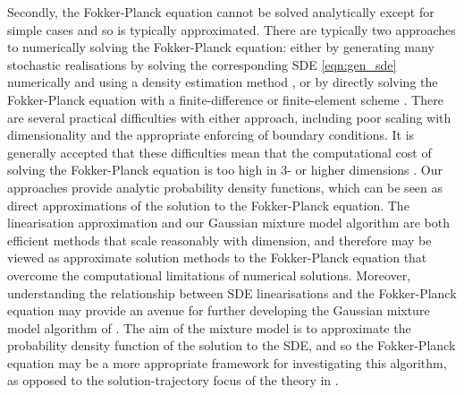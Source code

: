 Secondly, the Fokker-Planck equation cannot be solved analytically except for simple cases and so is typically approximated.
There are typically two approaches to numerically solving the Fokker-Planck equation: either by generating many stochastic realisations by solving the corresponding SDE \cref{eqn:gen_sde} numerically and using a density estimation method \citep{Silverman_2017_DensityEstimationStatistics}, or by directly solving the Fokker-Planck equation with a finite-difference or finite-element scheme \citep{PichlerEtAl_2013_NumericalSolutionFokker}.
There are several practical difficulties with either approach, including poor scaling with dimensionality and the appropriate enforcing of boundary conditions.
It is generally accepted that these difficulties mean that the computational cost of solving the Fokker-Planck equation is too high in \(3\)- or higher dimensions \citep{ZhaiEtAl_2022_DeepLearningMethod,Li_2019_DatadrivenMethodSteady,AllawalaMarston_2016_StatisticsStochasticallyForced,AndersonFarazmand_2024_FisherInformationShapemorphing}.
Our approaches provide analytic probability density functions, which can be seen as direct approximations of the solution to the Fokker-Planck equation.
The linearisation approximation and our Gaussian mixture model algorithm are both efficient methods that scale reasonably with dimension, and therefore may be viewed as approximate solution methods to the Fokker-Planck equation that overcome the computational limitations of numerical solutions.
Moreover, understanding the relationship between SDE linearisations and the Fokker-Planck equation may provide an avenue for further developing the Gaussian mixture model algorithm of .
The aim of the mixture model is to approximate the probability density function of the solution to the SDE, and so the Fokker-Planck equation may be a more appropriate framework for investigating this algorithm, as opposed to the solution-trajectory focus of the theory in .

